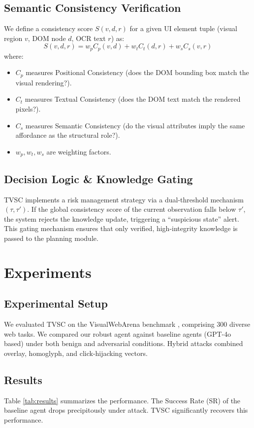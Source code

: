 \documentclass[runningheads]{llncs}
\begin{document}
\subsection{Semantic Consistency Verification}
We define a consistency score $S(v, d, r)$ for a given UI element tuple (visual region $v$, DOM node $d$, OCR text $r$) as:
\begin{equation}
S(v, d, r) = w_p C_p(v, d) + w_t C_t(d, r) + w_s C_s(v, r)
\end{equation}
where:
\begin{itemize}
    \item $C_p$ measures Positional Consistency (does the DOM bounding box match the visual rendering?).
    \item $C_t$ measures Textual Consistency (does the DOM text match the rendered pixels?).
    \item $C_s$ measures Semantic Consistency (do the visual attributes imply the same affordance as the structural role?).
    \item $w_p, w_t, w_s$ are weighting factors.
\end{itemize}

\subsection{Decision Logic \& Knowledge Gating}
TVSC implements a risk management strategy via a dual-threshold mechanism $(\tau, \tau')$. If the global consistency score of the current observation falls below $\tau'$, the system rejects the knowledge update, triggering a ``suspicious state'' alert. This gating mechanism ensures that only verified, high-integrity knowledge is passed to the planning module.

\section{Experiments}
\subsection{Experimental Setup}
We evaluated TVSC on the VisualWebArena benchmark \cite{visualwebarena}, comprising 300 diverse web tasks. We compared our robust agent against baseline agents (GPT-4o based) under both benign and adversarial conditions. Hybrid attacks combined overlay, homoglyph, and click-hijacking vectors.

\subsection{Results}
Table \ref{tab:results} summarizes the performance. The Success Rate (SR) of the baseline agent drops precipitously under attack. TVSC significantly recovers this performance.
\end{document}
